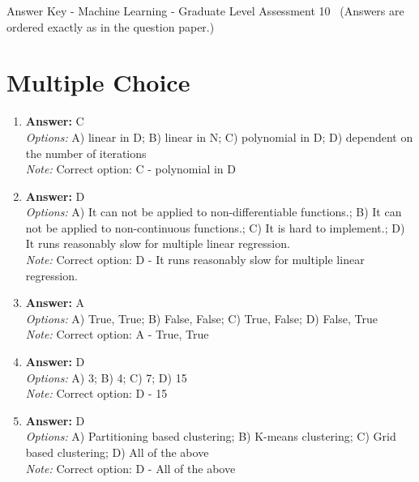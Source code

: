 \documentclass[12pt]{article}
\begin{document}
\begin{center}
Answer Key - Machine Learning - Graduate Level Assessment 10 \
\small (Answers are ordered exactly as in the question paper.)
\end{center}

\section*{Multiple Choice}
\begin{enumerate}[label=\arabic*.]
\item \textbf{Answer:} C
\\ \textit{Options:} A) linear in D; B) linear in N; C) polynomial in D; D) dependent on the number of iterations
\\ \textit{Note:} Correct option: C - polynomial in D
\item \textbf{Answer:} D
\\ \textit{Options:} A) It can not be applied to non-differentiable functions.; B) It can not be applied to non-continuous functions.; C) It is hard to implement.; D) It runs reasonably slow for multiple linear regression.
\\ \textit{Note:} Correct option: D - It runs reasonably slow for multiple linear regression.
\item \textbf{Answer:} A
\\ \textit{Options:} A) True, True; B) False, False; C) True, False; D) False, True
\\ \textit{Note:} Correct option: A - True, True
\item \textbf{Answer:} D
\\ \textit{Options:} A) 3; B) 4; C) 7; D) 15
\\ \textit{Note:} Correct option: D - 15
\item \textbf{Answer:} D
\\ \textit{Options:} A) Partitioning based clustering; B) K-means clustering; C) Grid based clustering; D) All of the above
\\ \textit{Note:} Correct option: D - All of the above
\end{enumerate}
\end{document}
